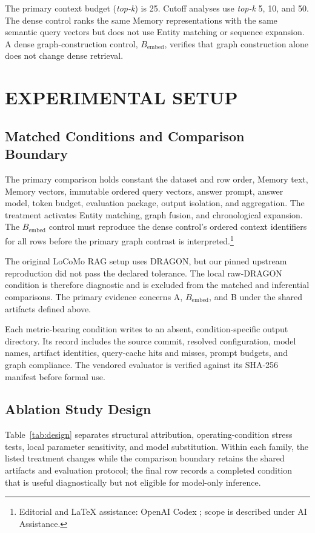 \documentclass[a4paper,twoside]{article}
\newcommand{\bembed}{B_{\mathrm{embed}}}
\newcommand{\topk}{\textit{top-k}}
\newcommand{\aiedit}{\footnote{Editorial and \LaTeX{} assistance: OpenAI Codex
\cite{openai2026codex}; scope is described under AI Assistance.}}
\begin{document}
The primary context budget (\topk{}) is 25. Cutoff analyses use \topk{} 5, 10,
and 50. The dense control ranks the same Memory representations with the same
semantic query vectors but does not use Entity matching or sequence expansion.
A dense graph-construction control, \(\bembed\), verifies that graph
construction alone does not change dense retrieval.

\section{\uppercase{Experimental Setup}}

\subsection{Matched Conditions and Comparison Boundary}

The primary comparison holds constant the dataset and row order, Memory text,
Memory vectors, immutable ordered query vectors, answer prompt, answer model,
token budget, evaluation package, output isolation, and aggregation. The
treatment activates Entity matching, graph fusion, and chronological
expansion. The \(\bembed\) control must reproduce the dense control's ordered
context identifiers for all rows before the primary graph contrast is
interpreted.\aiedit{}

The original LoCoMo RAG setup uses DRAGON, but our pinned upstream
reproduction did not pass the declared tolerance. The local raw-DRAGON
condition is therefore diagnostic and is excluded from the matched and
inferential comparisons. The primary evidence concerns A, \(\bembed\), and B
under the shared artifacts defined above.

Each metric-bearing condition writes to an absent, condition-specific output
directory. Its record includes the source commit, resolved configuration,
model names, artifact identities, query-cache hits and misses, prompt budgets,
and graph compliance. The vendored evaluator is verified against its SHA-256
manifest before formal use.

\subsection{Ablation Study Design}

Table~\ref{tab:design} separates structural attribution, operating-condition
stress tests, local parameter sensitivity, and model substitution.
Within each family, the listed treatment changes while the comparison boundary
retains the shared artifacts and evaluation protocol; the final row records a
completed condition that is useful diagnostically but not eligible for
model-only inference.
\end{document}
